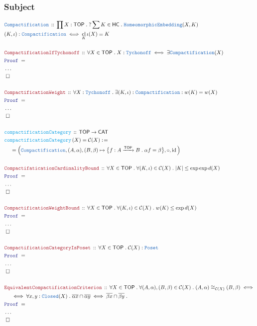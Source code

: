 \documentclass[12pt]{scrartcl}
\newcommand{\TYPE}[1]{\textcolor{NavyBlue}{\mathtt{#1}}}
\newcommand{\FUNC}[1]{\textcolor{Cerulean}{\mathtt{#1}}}
\newcommand{\LOGIC}[1]{\textcolor{Blue}{\mathtt{#1}}}
\newcommand{\THM}[1]{\textcolor{Maroon}{\mathtt{#1}}}
\renewcommand{\.}{\; . \;}
\newcommand{\de}{: \kern 0.1pc =}
\newcommand{\Act}[1]{\left( #1 \right)}
\newcommand{\Theorem}[2]{& \THM{#1} \, :: \, #2 \\ & \Proof = \\ }
\newcommand{\DeclareType}[2]{& \TYPE{#1} \, :: \, #2 \\}
\newcommand{\DefineType}[3]{& #1 : \TYPE{#2} \iff #3 \\}
\newcommand{\DeclareFunc}[2]{& \FUNC{#1} \, :: \, #2 \\}
\newcommand{\DefineNamedFunc}[4]{&  \FUNC{#1}\Act{#2} = #3 \de #4 \\}
\newcommand{\NewLine}{\\ & \kern 1pc}
\newcommand{\Page}[1]{ \begin{align*} #1 \end{align*}   }
\newcommand{\NoProof}{ & \ldots \\ \EndProof}
\DeclareMathOperator*{\id}{id}
\newcommand{\Arrow}{\xrightarrow}
\newcommand{\QED}{\; \square}
\newcommand{\EndProof}{& \QED \\}
\newcommand{\Proof}{\LOGIC{Proof} \; }
\newcommand{\C}{\mathcal{C}}
\newcommand{\CAT}{\mathsf{CAT}}
\DeclareMathOperator*{\cl}{cl}
\newcommand{\TOP}{\mathsf{TOP}}
\newcommand{\HC}{\mathsf{HC}}
\begin{document}
\subsubsection{Subject}
\Page{
	\DeclareType{Compactification}
	{
		\prod X : \TOP \.  
		?\sum  K \in \HC \.
		\TYPE{HomeomorphicEmbedding}(X,K) 
	}
	\DefineType{(K,\iota)}{Compactification}{\cl_K \iota(X) = K}
	\\
	\Theorem{CompactificationIfTychonoff}
	{
		\forall  X \in \TOP \.
		X : \TYPE{Tychonoff} \iff 
		\exists \TYPE{Compactification}(X)
	}
	\NoProof
	\\
	\Theorem{CompactificationWeight}
	{
		\forall X : \TYPE{Tychonoff} \.
		\exists (K,\iota) : \TYPE{Compactification} :
		w(K) = w(X)
	}
	\NoProof
	\\
	\DeclareFunc{compactificationCategory}{ \TOP \to \CAT}
	\DefineNamedFunc{compactificationCategory}{X}{\C(X)} 
	{
		\NewLine = 
		\Big( \TYPE{Compactification},(A,\alpha),(B,\beta) \mapsto \big\{ f : A \Arrow{\TOP} B \. 
		\alpha f = \beta \big\}, \circ, \id \Big)
	}
	\\
	\Theorem{CompactifaticationCardinalityBound}
	{
		\forall X \in \TOP \. \forall (K,\iota) \in \C(X) \.  |K| \le \exp \exp d(X) 
	}
	\NoProof
	\\
	\Theorem{CompactificationWeightBound}
	{
		\forall X \in \TOP \. \forall (K,\iota) \in \C(X) \. w(K) \le \exp d(X)
	}
	\NoProof
	\\
	\Theorem{CompactificationCategoryIsPoset}{\forall X \in \TOP \. \C(X) : \TYPE{Poset}}
	\NoProof
	\\
	\Theorem{EquivalentCompactificationCriterion}
	{
		\forall X \in \TOP \. 
		\forall (A,\alpha), (B,\beta) \in \C(X) \.
		(A,\alpha) \cong_{\C(X)} (B,\beta) \iff \NewLine \iff
		\forall x,y : \TYPE{Closed}(X) \.
		\overline{\alpha x} \cap \overline{\alpha y} 
		\iff
		\overline{\beta x} \cap \overline{\beta y} \.
	}
	\NoProof
}
\end{document}
